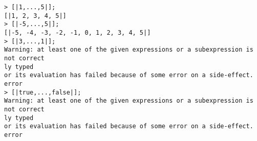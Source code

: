 \begin{center}\begin{minipage}{15cm}\begin{Verbatim}[frame=single]
> [|1,...,5|];
[|1, 2, 3, 4, 5|]
> [|-5,...,5|];
[|-5, -4, -3, -2, -1, 0, 1, 2, 3, 4, 5|]
> [|3,...,1|];
Warning: at least one of the given expressions or a subexpression is not correct
ly typed
or its evaluation has failed because of some error on a side-effect.
error
> [|true,...,false|];
Warning: at least one of the given expressions or a subexpression is not correct
ly typed
or its evaluation has failed because of some error on a side-effect.
error
\end{Verbatim}
\end{minipage}\end{center}
